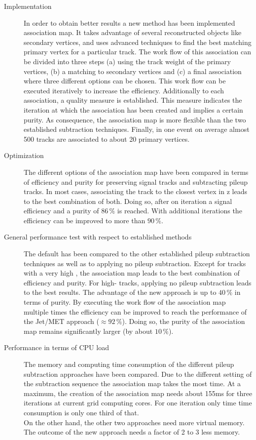 \begin{description}

\item[Implementation] In order to obtain better results a new method has been implemented  association map. It takes advantage of several reconstructed objects like secondary vertices, and uses advanced techniques to find the best matching primary vertex for a particular track. The work flow of this association can be divided into three steps (a) using the track weight of the primary vertices, (b) a matching to secondary vertices and (c) a final association where three different options can be chosen. This work flow can be executed iteratively to increase the efficiency. Additionally to each association, a quality measure is established. This measure indicates the iteration at which the association has been created and implies a certain purity. As consequence, the association map is more flexible than the two established subtraction techniques. Finally, in one event on average almost 500 tracks are associated to about 20 primary vertices.

\item[Optimization] The different options of the association map have been compared in terms of efficiency and purity for preserving signal tracks and subtracting pileup tracks. In most cases, associating the track to the closest vertex in z leads to the best combination of both. Doing so, after on iteration a signal efficiency and a purity of $86\,\%$ is reached. With additional iterations the efficiency can be improved to more than $90\,\%$.

\item[General performance test with respect to established methods] The default  has been compared to the other established pileup subtraction techniques as well as to applying no pileup subtraction. Except for tracks with a very high \pt{}, the association map leads to the best combination of efficiency and purity. For high-\pt{} tracks, applying no pileup subtraction leads to the best results. The advantage of the new approach is up to $40\,\%$ in terms of purity. By executing the work flow of the association map multiple times the efficiency can be improved to reach the performance of the Jet/MET approach ($\approx92\,\%$). Doing so, the purity of the association map remains significantly larger (by about $10\,\%$).

\item[Performance in terms of CPU load] The memory and computing time consumption of the different pileup subtraction approaches have been compared. Due to the different setting of the subtraction sequence the association map takes the most time. At a maximum, the creation of the association map needs about 155\unit{ms} for three iterations at current grid computing cores. For one iteration only time time consumption is only one third of that. \\
On the other hand, the other two approaches need more virtual memory. The outcome of the new approach needs a factor of 2 to 3 less memory.


\end{description}
